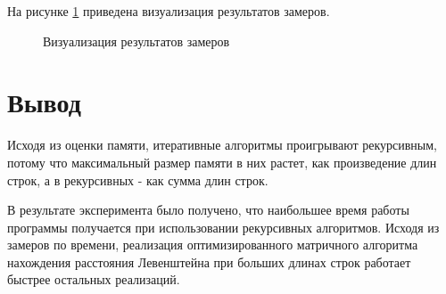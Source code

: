 На рисунке \ref{img:graphs} приведена визуализация результатов замеров.

\begin{figure}[H]
	\center{}
	\caption{Визуализация результатов замеров}
	\label{img:graphs}
\end{figure}

\section{Вывод}

Исходя из оценки памяти, итеративные алгоритмы проигрывают рекурсивным, потому что максимальный размер памяти в них растет, как произведение длин строк, а в рекурсивных - как сумма длин строк.

В результате эксперимента было получено, что наибольшее время работы программы получается при использовании рекурсивных алгоритмов. Исходя из замеров по времени, реализация оптимизированного матричного алгоритма нахождения расстояния Левенштейна при больших длинах строк работает быстрее остальных реализаций. 
